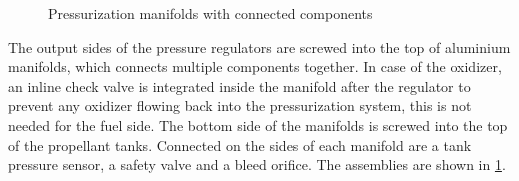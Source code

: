 \begin{figure}[H]
\centering
{}
\caption{Pressurization manifolds with connected components}
\label{fig:sysarch_prop_pressManifolds}
\end{figure}

The output sides of the pressure regulators are screwed into the top of aluminium manifolds, which connects multiple components together. In case of the oxidizer, an inline check valve is integrated inside the manifold after the regulator to prevent any oxidizer flowing back into the pressurization system, this is not needed for the fuel side. The bottom side of the manifolds is screwed into the top of the propellant tanks. Connected on the sides of each manifold are a tank pressure sensor, a safety valve and a bleed orifice. The assemblies are shown in \cref{fig:sysarch_prop_pressManifolds}.

